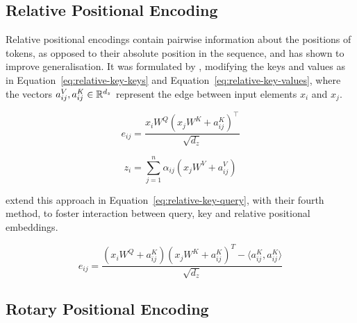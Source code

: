 \subsection{Relative Positional Encoding}

Relative positional encodings contain pairwise information about the positions of tokens, as opposed to their absolute position in the sequence, and has shown to improve generalisation.
It was formulated by \citet{shaw2018self}, modifying the keys and values as in Equation~\ref{eq:relative-key-keys} and Equation~\ref{eq:relative-key-values}, where the vectors $a^V_{ij}, a^K_{ij} \in \mathbb{R}^{d_z}$ represent the edge between input elements $x_i$ and $x_j$.

\begin{equation}
    \label{eq:relative-key-keys}
    e_{ij} = \frac{x_i W^Q (x_j W^K + a_{ij}^K)^\top}{\sqrt{d_z}}
\end{equation}

\begin{equation}
    \label{eq:relative-key-values}
    z_i = \sum_{j = 1}^n \alpha_{ij} (x_j W^V + a_{ij}^V)
\end{equation}

\citet{huang2020improvetransformermodelsbetter} extend this approach in Equation~\ref{eq:relative-key-query}, with their fourth method, to foster interaction between query, key and relative positional embeddings.

\begin{equation}
    \label{eq:relative-key-query}
    e_{ij} = \frac{(x_i W^Q + a_{ij}^K)(x_j W^K + a_{ij}^K)^T - \langle a_{ij}^K, a_{ij}^K\rangle}{\sqrt{d_z}}
\end{equation}



\subsection{Rotary Positional Encoding}

